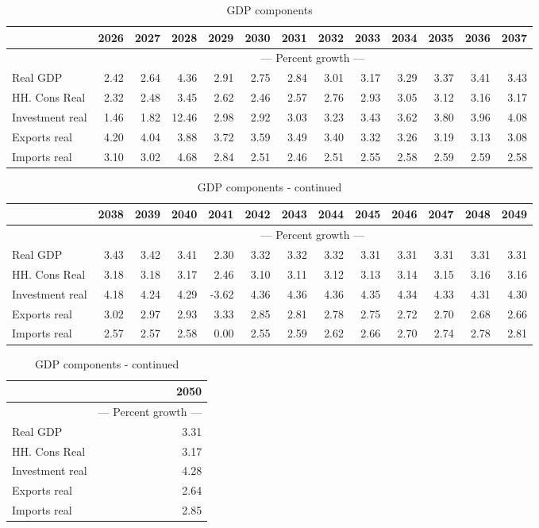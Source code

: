 \documentclass{article}
\begin{document}
\begin{table}[ht]
\caption{GDP components}
\begin{tabular}{lrrrrrrrrrrrr}
\toprule
 & 2026 & 2027 & 2028 & 2029 & 2030 & 2031 & 2032 & 2033 & 2034 & 2035 & 2036 & 2037 \\
\midrule
&\multicolumn{12}{c}{{--- Percent growth ---}}                                                             \\
Real GDP & 2.42 & 2.64 & 4.36 & 2.91 & 2.75 & 2.84 & 3.01 & 3.17 & 3.29 & 3.37 & 3.41 & 3.43 \\
HH. Cons Real & 2.32 & 2.48 & 3.45 & 2.62 & 2.46 & 2.57 & 2.76 & 2.93 & 3.05 & 3.12 & 3.16 & 3.17 \\
Investment real & 1.46 & 1.82 & 12.46 & 2.98 & 2.92 & 3.03 & 3.23 & 3.43 & 3.62 & 3.80 & 3.96 & 4.08 \\
Exports real & 4.20 & 4.04 & 3.88 & 3.72 & 3.59 & 3.49 & 3.40 & 3.32 & 3.26 & 3.19 & 3.13 & 3.08 \\
Imports real & 3.10 & 3.02 & 4.68 & 2.84 & 2.51 & 2.46 & 2.51 & 2.55 & 2.58 & 2.59 & 2.59 & 2.58 \\
\bottomrule
\end{tabular}
\end{table}
 \begin{table}[ht]
\caption{GDP components - continued }
\begin{tabular}{lrrrrrrrrrrrr}
\toprule
 & 2038 & 2039 & 2040 & 2041 & 2042 & 2043 & 2044 & 2045 & 2046 & 2047 & 2048 & 2049 \\
\midrule
&\multicolumn{12}{c}{{--- Percent growth ---}}                                                             \\
Real GDP & 3.43 & 3.42 & 3.41 & 2.30 & 3.32 & 3.32 & 3.32 & 3.31 & 3.31 & 3.31 & 3.31 & 3.31 \\
HH. Cons Real & 3.18 & 3.18 & 3.17 & 2.46 & 3.10 & 3.11 & 3.12 & 3.13 & 3.14 & 3.15 & 3.16 & 3.16 \\
Investment real & 4.18 & 4.24 & 4.29 & -3.62 & 4.36 & 4.36 & 4.36 & 4.35 & 4.34 & 4.33 & 4.31 & 4.30 \\
Exports real & 3.02 & 2.97 & 2.93 & 3.33 & 2.85 & 2.81 & 2.78 & 2.75 & 2.72 & 2.70 & 2.68 & 2.66 \\
Imports real & 2.57 & 2.57 & 2.58 & 0.00 & 2.55 & 2.59 & 2.62 & 2.66 & 2.70 & 2.74 & 2.78 & 2.81 \\
\bottomrule
\end{tabular}
\end{table}
 \begin{table}[ht]
\caption{GDP components - continued }
\begin{tabular}{lr}
\toprule
 & 2050 \\
\midrule
&\multicolumn{1}{c}{{--- Percent growth ---}}      \\
Real GDP & 3.31 \\
HH. Cons Real & 3.17 \\
Investment real & 4.28 \\
Exports real & 2.64 \\
Imports real & 2.85 \\
\bottomrule
\end{tabular}
\end{table}
\end{document}

